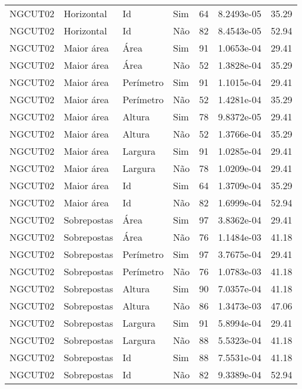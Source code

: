 \begin{tabular}{llllrrr}
    NGCUT02   & Horizontal  & Id        & Sim         & 64           & 8.2493e-05 & 35.29    \\
    NGCUT02   & Horizontal  & Id        & Não         & 82           & 8.4543e-05 & 52.94    \\
    NGCUT02   & Maior área  & Área      & Sim         & 91           & 1.0653e-04 & 29.41    \\
    NGCUT02   & Maior área  & Área      & Não         & 52           & 1.3828e-04 & 35.29    \\
    NGCUT02   & Maior área  & Perímetro & Sim         & 91           & 1.1015e-04 & 29.41    \\
    NGCUT02   & Maior área  & Perímetro & Não         & 52           & 1.4281e-04 & 35.29    \\
    NGCUT02   & Maior área  & Altura    & Sim         & 78           & 9.8372e-05 & 29.41    \\
    NGCUT02   & Maior área  & Altura    & Não         & 52           & 1.3766e-04 & 35.29    \\
    NGCUT02   & Maior área  & Largura   & Sim         & 91           & 1.0285e-04 & 29.41    \\
    NGCUT02   & Maior área  & Largura   & Não         & 78           & 1.0209e-04 & 29.41    \\
    NGCUT02   & Maior área  & Id        & Sim         & 64           & 1.3709e-04 & 35.29    \\
    NGCUT02   & Maior área  & Id        & Não         & 82           & 1.6999e-04 & 52.94    \\
    NGCUT02   & Sobrepostas & Área      & Sim         & 97           & 3.8362e-04 & 29.41    \\
    NGCUT02   & Sobrepostas & Área      & Não         & 76           & 1.1484e-03 & 41.18    \\
    NGCUT02   & Sobrepostas & Perímetro & Sim         & 97           & 3.7675e-04 & 29.41    \\
    NGCUT02   & Sobrepostas & Perímetro & Não         & 76           & 1.0783e-03 & 41.18    \\
    NGCUT02   & Sobrepostas & Altura    & Sim         & 90           & 7.0357e-04 & 41.18    \\
    NGCUT02   & Sobrepostas & Altura    & Não         & 86           & 1.3473e-03 & 47.06    \\
    NGCUT02   & Sobrepostas & Largura   & Sim         & 91           & 5.8994e-04 & 29.41    \\
    NGCUT02   & Sobrepostas & Largura   & Não         & 88           & 5.5323e-04 & 41.18    \\
    NGCUT02   & Sobrepostas & Id        & Sim         & 88           & 7.5531e-04 & 41.18    \\
    NGCUT02   & Sobrepostas & Id        & Não         & 82           & 9.3389e-04 & 52.94    \\
    \hline
\end{tabular}